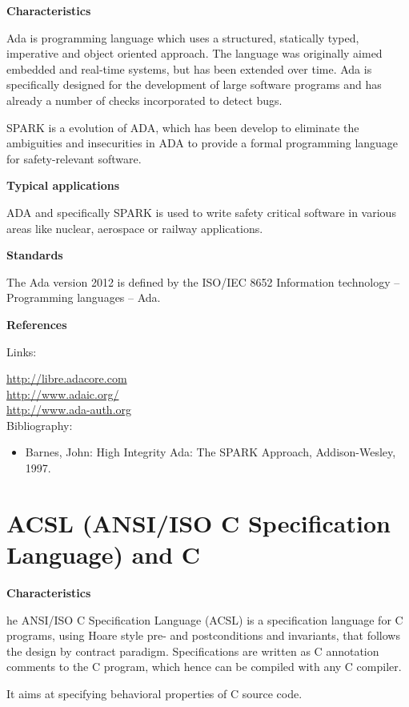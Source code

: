 \documentclass{./template/openetcs_report}
\begin{document}
	\textbf{Characteristics}

Ada is programming language which uses a structured, statically typed, imperative and object oriented approach. The language was originally aimed embedded and real-time systems, but has been extended over time. Ada is specifically designed for the development of large software programs and has already a number of checks incorporated to detect bugs. 

SPARK is a evolution of ADA, which has been develop to eliminate the ambiguities and insecurities in ADA to provide a formal programming language for safety-relevant software. 

	\textbf{Typical applications}

ADA and specifically SPARK is used to write safety critical software in various areas like nuclear, aerospace or railway applications.

	\textbf{Standards}

The Ada version 2012 is defined by the ISO/IEC 8652 Information technology -- Programming languages -- Ada.

	\textbf{References}

Links:

\url{http://libre.adacore.com} \\[4pt]
\url{http://www.adaic.org/} \\[4pt]
\url{http://www.ada-auth.org} \\[4pt]


Bibliography:

\begin{itemize}
\item Barnes, John: High Integrity Ada: The SPARK Approach, Addison-Wesley, 1997.
\end{itemize} 

\section{ACSL (ANSI/ISO C Specification Language) and C}


	\textbf{Characteristics}



he ANSI/ISO C Specification Language (ACSL) is a specification language for C programs, using Hoare style pre- and postconditions and invariants, that follows the design by contract paradigm. Specifications are written as C annotation comments to the C program, which hence can be compiled with any C compiler.

It aims at specifying behavioral properties of C source code.
\end{document}
